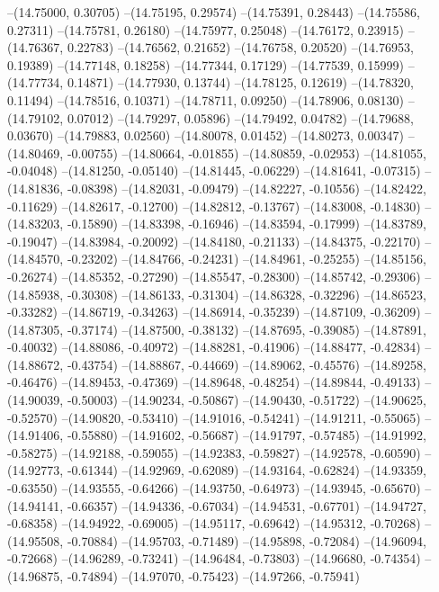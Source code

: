 --(14.75000, 0.30705)
--(14.75195, 0.29574)
--(14.75391, 0.28443)
--(14.75586, 0.27311)
--(14.75781, 0.26180)
--(14.75977, 0.25048)
--(14.76172, 0.23915)
--(14.76367, 0.22783)
--(14.76562, 0.21652)
--(14.76758, 0.20520)
--(14.76953, 0.19389)
--(14.77148, 0.18258)
--(14.77344, 0.17129)
--(14.77539, 0.15999)
--(14.77734, 0.14871)
--(14.77930, 0.13744)
--(14.78125, 0.12619)
--(14.78320, 0.11494)
--(14.78516, 0.10371)
--(14.78711, 0.09250)
--(14.78906, 0.08130)
--(14.79102, 0.07012)
--(14.79297, 0.05896)
--(14.79492, 0.04782)
--(14.79688, 0.03670)
--(14.79883, 0.02560)
--(14.80078, 0.01452)
--(14.80273, 0.00347)
--(14.80469, -0.00755)
--(14.80664, -0.01855)
--(14.80859, -0.02953)
--(14.81055, -0.04048)
--(14.81250, -0.05140)
--(14.81445, -0.06229)
--(14.81641, -0.07315)
--(14.81836, -0.08398)
--(14.82031, -0.09479)
--(14.82227, -0.10556)
--(14.82422, -0.11629)
--(14.82617, -0.12700)
--(14.82812, -0.13767)
--(14.83008, -0.14830)
--(14.83203, -0.15890)
--(14.83398, -0.16946)
--(14.83594, -0.17999)
--(14.83789, -0.19047)
--(14.83984, -0.20092)
--(14.84180, -0.21133)
--(14.84375, -0.22170)
--(14.84570, -0.23202)
--(14.84766, -0.24231)
--(14.84961, -0.25255)
--(14.85156, -0.26274)
--(14.85352, -0.27290)
--(14.85547, -0.28300)
--(14.85742, -0.29306)
--(14.85938, -0.30308)
--(14.86133, -0.31304)
--(14.86328, -0.32296)
--(14.86523, -0.33282)
--(14.86719, -0.34263)
--(14.86914, -0.35239)
--(14.87109, -0.36209)
--(14.87305, -0.37174)
--(14.87500, -0.38132)
--(14.87695, -0.39085)
--(14.87891, -0.40032)
--(14.88086, -0.40972)
--(14.88281, -0.41906)
--(14.88477, -0.42834)
--(14.88672, -0.43754)
--(14.88867, -0.44669)
--(14.89062, -0.45576)
--(14.89258, -0.46476)
--(14.89453, -0.47369)
--(14.89648, -0.48254)
--(14.89844, -0.49133)
--(14.90039, -0.50003)
--(14.90234, -0.50867)
--(14.90430, -0.51722)
--(14.90625, -0.52570)
--(14.90820, -0.53410)
--(14.91016, -0.54241)
--(14.91211, -0.55065)
--(14.91406, -0.55880)
--(14.91602, -0.56687)
--(14.91797, -0.57485)
--(14.91992, -0.58275)
--(14.92188, -0.59055)
--(14.92383, -0.59827)
--(14.92578, -0.60590)
--(14.92773, -0.61344)
--(14.92969, -0.62089)
--(14.93164, -0.62824)
--(14.93359, -0.63550)
--(14.93555, -0.64266)
--(14.93750, -0.64973)
--(14.93945, -0.65670)
--(14.94141, -0.66357)
--(14.94336, -0.67034)
--(14.94531, -0.67701)
--(14.94727, -0.68358)
--(14.94922, -0.69005)
--(14.95117, -0.69642)
--(14.95312, -0.70268)
--(14.95508, -0.70884)
--(14.95703, -0.71489)
--(14.95898, -0.72084)
--(14.96094, -0.72668)
--(14.96289, -0.73241)
--(14.96484, -0.73803)
--(14.96680, -0.74354)
--(14.96875, -0.74894)
--(14.97070, -0.75423)
--(14.97266, -0.75941)
